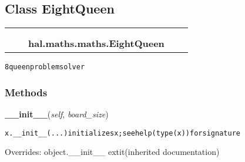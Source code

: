 
\subsection{Class EightQueen}

    \label{hal:maths:maths:EightQueen}
\begin{tabular}{cccccc}
\multicolumn{2}{r}{\settowidth{\BCL}{object}\multirow{2}{\BCL}{object}}
&&
  \\\cline{3-3}
  &&\multicolumn{1}{c|}{}
&&
  \\
&&\multicolumn{2}{l}{\textbf{hal.maths.maths.EightQueen}}
\end{tabular}

\begin{alltt}
8 queen problem solver 
\end{alltt}



  \subsubsection{Methods}

    \vspace{0.5ex}

\hspace{.8\funcindent}\begin{boxedminipage}{\funcwidth}

    \raggedright \textbf{\_\_init\_\_}(\textit{self}, \textit{board\_size})

\setlength{\parskip}{2ex}
\begin{alltt}
x.\_\_init\_\_(...) initializes x; see help(type(x)) for signature
\end{alltt}

\setlength{\parskip}{1ex}
      Overrides: object.\_\_init\_\_ 	extit{(inherited documentation)}

    \end{boxedminipage}


